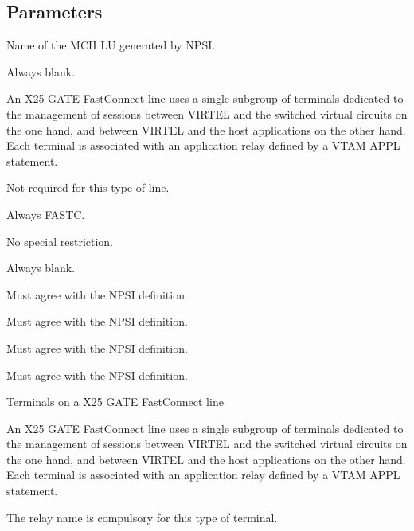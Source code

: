 \documentclass[letterpaper,10pt,english]{sphinxmanual}
\begin{document}
\subsection{Parameters}
\label{\detokenize{connectivity_guide:index-69}}\label{\detokenize{connectivity_guide:id31}}\begin{description}
\sphinxAtStartPar
Name of the MCH LU generated by NPSI.

\sphinxAtStartPar
Always blank.

\sphinxAtStartPar
An X25 GATE Fast\sphinxhyphen{}Connect line uses a single sub\sphinxhyphen{}group of terminals dedicated to the management of sessions between VIRTEL and the switched virtual circuits on the one hand, and between VIRTEL and the host applications on the other hand. Each terminal is associated with an application relay defined by a VTAM APPL statement.

\sphinxAtStartPar
Not required for this type of line.

\sphinxAtStartPar
Always FASTC.

\sphinxAtStartPar
No special restriction.

\sphinxAtStartPar
Always blank.

\sphinxAtStartPar
Must agree with the NPSI definition.

\sphinxAtStartPar
Must agree with the NPSI definition.

\sphinxAtStartPar
Must agree with the NPSI definition.

\sphinxAtStartPar
Must agree with the NPSI definition.

\end{description}

\sphinxAtStartPar
Terminals on a X25 GATE Fast\sphinxhyphen{}Connect line

\sphinxAtStartPar
An X25 GATE Fast\sphinxhyphen{}Connect line uses a single sub\sphinxhyphen{}group of terminals dedicated to the management of sessions between VIRTEL and the switched virtual circuits on the one hand, and between VIRTEL and the host applications on the other hand. Each terminal is associated with an application relay defined by a VTAM APPL statement.

\sphinxAtStartPar
The relay name is compulsory for this type of terminal.
\end{document}
